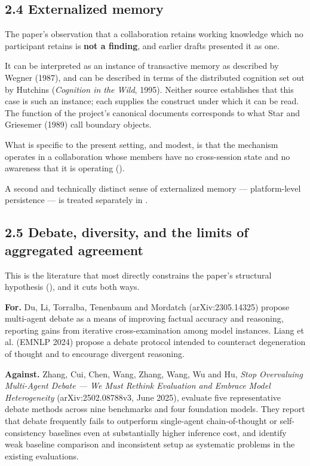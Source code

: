 \subsection*{2.4 Externalized memory}
\label{sec:en:2.4}

The paper's observation that a collaboration retains working knowledge which no participant retains is \textbf{not a finding}, and earlier drafts presented it as one.

\gcheck{} It can be interpreted as an instance of transactive memory as described by Wegner (1987), and can be described in terms of the distributed cognition set out by Hutchins (\emph{Cognition in the Wild}, 1995). Neither source establishes that this case is such an instance; each supplies the construct under which it can be read. \gcheck{} The function of the project's canonical documents corresponds to what Star and Griesemer (1989) call boundary objects.
\nocite{wegner1987transactive,hutchins1995cognition,star1989boundary}

What is specific to the present setting, and modest, is that the mechanism operates in a collaboration whose members have no cross-session state and no awareness that it is operating ().

A second and technically distinct sense of externalized memory — platform-level persistence — is treated separately in .


\subsection*{2.5 Debate, diversity, and the limits of aggregated agreement}
\label{sec:en:2.5}

This is the literature that most directly constrains the paper's structural hypothesis (), and it cuts both ways.

\textbf{For.} \gcheck{} Du, Li, Torralba, Tenenbaum and Mordatch (arXiv:2305.14325) propose multi-agent debate as a means of improving factual accuracy and reasoning, reporting gains from iterative cross-examination among model instances. \gcheck{} Liang et al. (EMNLP 2024) propose a debate protocol intended to counteract degeneration of thought and to encourage divergent reasoning.
\nocite{du2023multiagentdebate,liang2024divergent}

\textbf{Against.} \gcheck{} Zhang, Cui, Chen, Wang, Zhang, Wang, Wu and Hu, \emph{Stop Overvaluing Multi-Agent Debate — We Must Rethink Evaluation and Embrace Model Heterogeneity} (arXiv:2502.08788v3, June 2025), evaluate five representative debate methods across nine benchmarks and four foundation models. They report that debate frequently fails to outperform single-agent chain-of-thought or self-consistency baselines even at substantially higher inference cost, and identify weak baseline comparison and inconsistent setup as systematic problems in the existing evaluations.
\nocite{zhang2025overvaluing}

